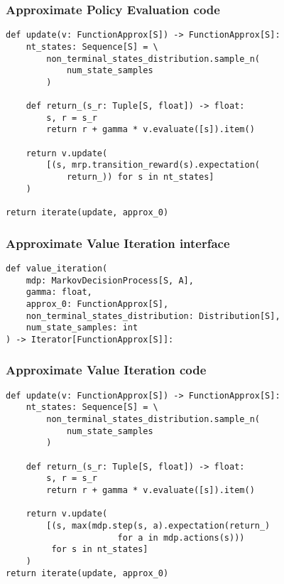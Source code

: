 \documentclass[handout]{beamer}
\begin{document}
\begin{frame}[fragile]
\frametitle{Approximate Policy Evaluation code}
\pause
\begin{lstlisting}
def update(v: FunctionApprox[S]) -> FunctionApprox[S]:
    nt_states: Sequence[S] = \
        non_terminal_states_distribution.sample_n(
            num_state_samples
        )

    def return_(s_r: Tuple[S, float]) -> float:
        s, r = s_r
        return r + gamma * v.evaluate([s]).item()

    return v.update(
        [(s, mrp.transition_reward(s).expectation(
            return_)) for s in nt_states]
    )

return iterate(update, approx_0)
\end{lstlisting}
\end{frame}

\begin{frame}[fragile]
\frametitle{Approximate Value Iteration interface}
\pause
\begin{lstlisting}
def value_iteration(
    mdp: MarkovDecisionProcess[S, A],
    gamma: float,
    approx_0: FunctionApprox[S],
    non_terminal_states_distribution: Distribution[S],
    num_state_samples: int
) -> Iterator[FunctionApprox[S]]:
\end{lstlisting}
\end{frame}

\begin{frame}[fragile]
\frametitle{Approximate Value Iteration code}
\pause
\begin{lstlisting}
def update(v: FunctionApprox[S]) -> FunctionApprox[S]:
    nt_states: Sequence[S] = \
        non_terminal_states_distribution.sample_n(
            num_state_samples
        )

    def return_(s_r: Tuple[S, float]) -> float:
        s, r = s_r
        return r + gamma * v.evaluate([s]).item()

    return v.update(
        [(s, max(mdp.step(s, a).expectation(return_)
                      for a in mdp.actions(s)))
         for s in nt_states]
    )
return iterate(update, approx_0)
\end{lstlisting}
\end{frame}
\end{document}

